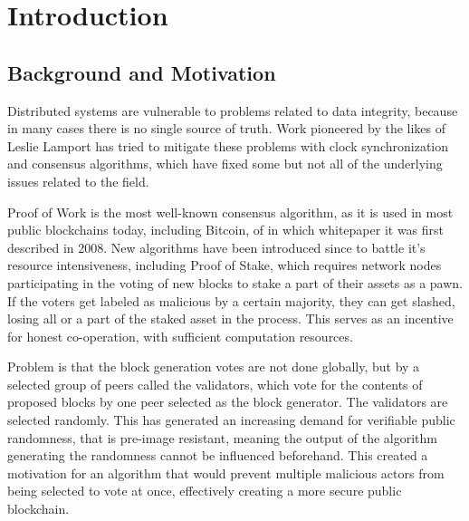 \chapter{Introduction}
\label{Introduction}


\section{Background and Motivation}
\label{Background and Motivation}

Distributed systems are vulnerable to problems related to data integrity, because in many cases there is no single source of truth. Work pioneered by the likes of Leslie Lamport has tried to mitigate these problems with clock synchronization and consensus algorithms, which have fixed some but not all of the underlying issues related to the field.




Proof of Work is the most well-known consensus algorithm, as it is used in most public blockchains today, including Bitcoin, of in which whitepaper it was first described in 2008. New algorithms have been introduced since to battle it's resource intensiveness, including Proof of Stake, which requires network nodes participating in the voting of new blocks to stake a part of their assets as a pawn. If the voters get labeled as malicious by a certain majority, they can get slashed, losing all or a part of the staked asset in the process. This serves as an incentive for honest co-operation, with sufficient computation resources.

Problem is that the block generation votes are not done globally, but by a selected group of peers called the validators, which vote for the contents of proposed blocks by one peer selected as the block generator. The validators are selected randomly. This has generated an increasing demand for verifiable public randomness, that is pre-image resistant, meaning the output of the algorithm generating the randomness cannot be influenced beforehand. This created a motivation for an algorithm that would prevent multiple malicious actors from being selected to vote at once, effectively creating a more secure public blockchain.

